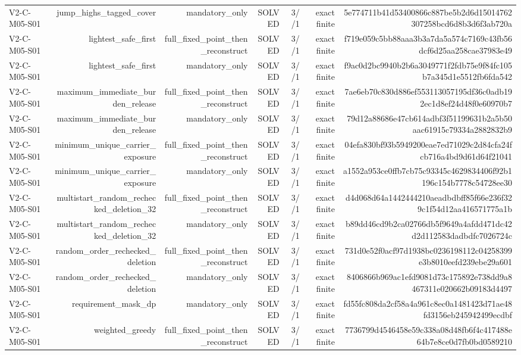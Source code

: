 {\begin{longtable}{lrrrrrr}
V2-C-M05-S01 & jump\_highs\_tagged\_cover & mandatory\_only & SOLVED & 3//1 & exact finite & 5e774711b41d53400866c887be5b2d6d15014762307258bcd6d8b3d6f3ab720a \\
V2-C-M05-S01 & lightest\_safe\_first & full\_fixed\_point\_then\_reconstruct & SOLVED & 3//1 & exact finite & f719e059c5bb88aaa3b3a7da5a574c7169c43fb56dcf6d25aa258cae37983e49 \\
V2-C-M05-S01 & lightest\_safe\_first & mandatory\_only & SOLVED & 3//1 & exact finite & f9ac0d2bc9940b2b6a3049771f2fdb75e9f84fc105b7a345d1e5512fb6fda542 \\
V2-C-M05-S01 & maximum\_immediate\_burden\_release & full\_fixed\_point\_then\_reconstruct & SOLVED & 3//1 & exact finite & 7ae6eb70c830d886ef553113057195df36c0adb192ec1d8ef24d48f0e60970b7 \\
V2-C-M05-S01 & maximum\_immediate\_burden\_release & mandatory\_only & SOLVED & 3//1 & exact finite & 79d12a88686e47cb614adbf3f51199631b2a5b50aac61915c79334a2882832b9 \\
V2-C-M05-S01 & minimum\_unique\_carrier\_exposure & full\_fixed\_point\_then\_reconstruct & SOLVED & 3//1 & exact finite & 04efa830bf93b5949200eae7ed71029c2d84cfa24fcb716a4bd9d61d64f21041 \\
V2-C-M05-S01 & minimum\_unique\_carrier\_exposure & mandatory\_only & SOLVED & 3//1 & exact finite & a1552a953ce0ffb7cb75c93345c4629834406f92b1196c154b7778c54728ee30 \\
V2-C-M05-S01 & multistart\_random\_rechecked\_deletion\_32 & full\_fixed\_point\_then\_reconstruct & SOLVED & 3//1 & exact finite & d4d068d64a1442444210aeadbdbff85f66e236f329c1f54d12aa416571775a1b \\
V2-C-M05-S01 & multistart\_random\_rechecked\_deletion\_32 & mandatory\_only & SOLVED & 3//1 & exact finite & b89dd46cd9b2ca02766db5f9649a4afdd471dc42d2d112583dadbdfc7026724c \\
V2-C-M05-S01 & random\_order\_rechecked\_deletion & full\_fixed\_point\_then\_reconstruct & SOLVED & 3//1 & exact finite & 731d0e52f0acf97d1938bc0236198112c04258399e3b8010eefd239ebe29a601 \\
V2-C-M05-S01 & random\_order\_rechecked\_deletion & mandatory\_only & SOLVED & 3//1 & exact finite & 8406866b969ac1efd9081d73c175892e738dd9a8467311e020662b09183d4497 \\
V2-C-M05-S01 & requirement\_mask\_dp & mandatory\_only & SOLVED & 3//1 & exact finite & fd55fc808da2cf58a4a961c8ec0a1481423d71ae48fd3156eb245942499ecdbf \\
V2-C-M05-S01 & weighted\_greedy & full\_fixed\_point\_then\_reconstruct & SOLVED & 3//1 & exact finite & 7736799d4546458e59c338a08d48fb6f4c417488e64b7e8ce0d7fb0bd0589210 \\

\end{longtable}}
